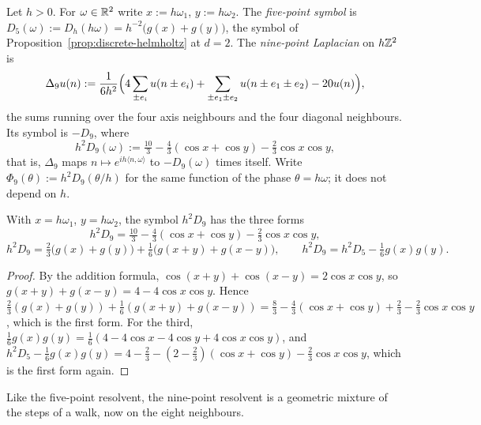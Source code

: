 \begin{definition}
\label{def:nine-point-laplacian}

Let $h > 0$. For $\omega \in \mathbb{R}^2$ write $x := h\omega_1$, $y := h\omega_2$. The \emph{five-point
symbol} is $D_5(\omega) := D_h(h\omega) = h^{-2}\bigl(g(x) + g(y)\bigr)$, the symbol of
Proposition~\ref{prop:discrete-helmholtz} at $d = 2$. The \emph{nine-point Laplacian} on $h\mathbb{Z}^2$ is
\[
  \Delta_9u(n) := \frac{1}{6h^2}\Bigl(4\sum_{\pm e_i}u(n \pm e_i)
  + \sum_{\pm e_1 \pm e_2}u(n \pm e_1 \pm e_2) - 20u(n)\Bigr),
\]
the sums running over the four axis neighbours and the four diagonal neighbours. Its symbol is
$-D_9$, where
\[
  h^2D_9(\omega) := \tfrac{10}{3} - \tfrac43(\cos x + \cos y) - \tfrac23\cos x\cos y ,
\]
that is, $\Delta_9$ maps $n \mapsto e^{ih\langle n, \omega\rangle}$ to $-D_9(\omega)$ times itself.
Write $\Phi_9(\theta) := h^2D_9(\theta/h)$ for the same function of the phase $\theta = h\omega$; it
does not depend on $h$.
\end{definition}

\begin{lemma}
\label{lem:nine-point-symbol}

With $x = h\omega_1$, $y = h\omega_2$, the symbol $h^2D_9$ has the three forms
\[
  h^2D_9 = \tfrac{10}{3} - \tfrac43(\cos x + \cos y) - \tfrac23\cos x\cos y ,
\]
\[
  h^2D_9 = \tfrac23\bigl(g(x) + g(y)\bigr) + \tfrac16\bigl(g(x+y) + g(x-y)\bigr) , \qquad
  h^2D_9 = h^2D_5 - \tfrac16g(x)g(y) .
\]
\end{lemma}

\begin{proof}
By the addition formula, $\cos(x+y) + \cos(x-y) = 2\cos x\cos y$, so
$g(x+y) + g(x-y) = 4 - 4\cos x\cos y$. Hence
$\tfrac23(g(x) + g(y)) + \tfrac16(g(x+y) + g(x-y)) = \tfrac83 - \tfrac43(\cos x + \cos y) + \tfrac23
- \tfrac23\cos x\cos y$, which is the first form. For the third,
$\tfrac16g(x)g(y) = \tfrac16(4 - 4\cos x - 4\cos y + 4\cos x\cos y)$, and
$h^2D_5 - \tfrac16g(x)g(y) = 4 - \tfrac23 - (2 - \tfrac23)(\cos x + \cos y) - \tfrac23\cos x\cos y$,
which is the first form again.
\end{proof}

Like the five-point resolvent, the nine-point resolvent is a geometric mixture of the steps of a
walk, now on the eight neighbours.


